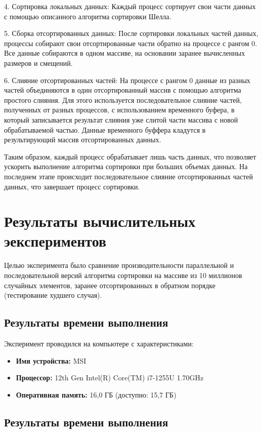 \documentclass{report}
\begin{document}
4. Сортировка локальных данных: Каждый процесс сортирует свои части данных с помощью описанного алгоритма сортировки Шелла. 

5. Сборка отсортированных данных: После сортировки локальных частей данных, процессы собирают свои отсортированные части обратно на процессе с рангом 0. Все данные собираются в одном массиве, на основании заранее вычисленных размеров и смещений.

6. Слияние отсортированных частей: На процессе с рангом 0 данные из разных частей объединяются в один отсортированный массив с помощью алгоритма простого слияния. Для этого используется последовательное слияние частей, полученных от разных процессов, с использованием временного буфера, в который записывается результат слияния уже слитой части массива с новой обрабатываемой частью. Данные временного буффера кладутся в результирующий массив отсортированных данных.

Таким образом, каждый процесс обрабатывает лишь часть данных, что позволяет ускорить выполнение алгоритма сортировки при больших объемах данных. На последнем этапе происходит последовательное слияние отсортированных частей данных, что завершает процесс сортировки.

\newpage
\section*{Результаты вычислительных эекспериментов}

Целью эксперимента было сравнение производительности параллельной и последовательной версий алгоритма сортировки на массиве из 10 миллионов случайных элементов, заранее отсортированных в обратном порядке (тестирование худшего случая).

\subsection*{Результаты времени выполнения}
Эксперимент проводился на компьютере с характеристиками:
\begin{itemize}
    \item \textbf{Имя устройства:} MSI
    \item \textbf{Процессор:} 12th Gen Intel(R) Core(TM) i7-1255U 1.70GHz
    \item \textbf{Оперативная память:} 16,0 ГБ (доступно: 15,7 ГБ)
\end{itemize}

\subsection*{Результаты времени выполнения}
\end{document}
